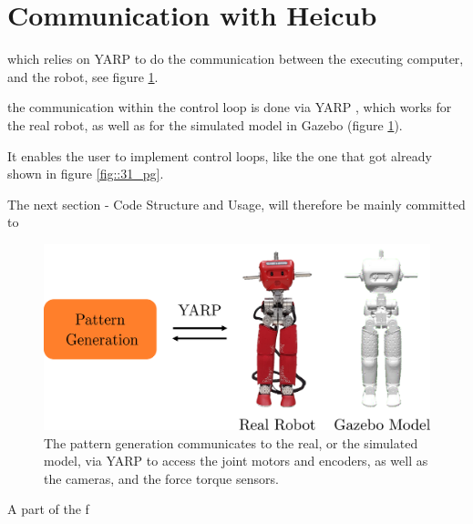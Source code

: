 \section{Communication with Heicub}
\label{sec::34_co}

which relies on YARP \cite{metta2006yarp} to do the communication between the executing computer, and the robot, see figure \ref{fig::3_yarp}. 





the communication within the control loop is done via YARP \cite{metta2006yarp}, which works for the real robot, as well as for the simulated model in Gazebo \cite{koenig2004design} (figure \ref{fig::3_yarp}). 



It enables the user to implement control loops, like the one that got already shown in figure \ref{fig::31_pg}.

The next section - Code Structure and Usage, will therefore be mainly committed to 




\begin{figure}[h!]
	\centering
	\includegraphics[scale=.25]{chapters/04_methods/img/yarp.png}
	\caption{The pattern generation communicates to the real, or the simulated model, via YARP to access the joint motors and encoders, as well as the cameras, and the force torque sensors.}
	\label{fig::3_yarp}
\end{figure}
A part of the f 
